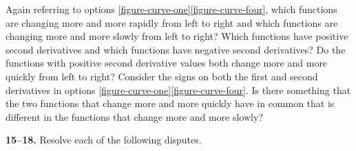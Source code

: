 \documentclass[10pt,oneside,]{book}
\theoremstyle{plain}
\theoremstyle{definition}
\numberwithin{equation}{section}
\newcounter{figstack}
\newcounter{figindex}
\newlength\fight
\newcommand\pushValignCaptionBottom[5][b]{%
\stepcounter{figstack}%
\expandafter\def\csname %
figalign\romannumeral\value{figstack}\endcsname{#1}%
\expandafter\def\csname %
figtype\romannumeral\value{figstack}\endcsname{#2}%
\expandafter\def\csname %
figwd\romannumeral\value{figstack}\endcsname{#3}%
\expandafter\def\csname %
figcontent\romannumeral\value{figstack}\endcsname{#4}%
\expandafter\def\csname %
figcap\romannumeral\value{figstack}\endcsname{#5}%
\setbox0=\hbox{%
\begin{#2}{#3}#4\end{#2}}%
\ifdim\dimexpr\ht0+\dp0\relax>\fight\global\setlength{\fight}{%
\dimexpr\ht0+\dp0\relax}\fi%
}
\newcommand\popValignCaptionBottom{%
\setcounter{figindex}{0}%
\hfill%
\whiledo{\value{figindex}<\value{figstack}}{%
\stepcounter{figindex}%
\def\tmp{\csname figwd\romannumeral\value{figindex}\endcsname}%
\begin{\csname figtype\romannumeral\value{figindex}\endcsname}[t]{\tmp}%
\centering%
\stackinset{c}{}%
{\csname figalign\romannumeral\value{figindex}\endcsname}{}%
{\csname figcontent\romannumeral\value{figindex}\endcsname}%
{\rule{0pt}{\fight}}\par%
\csname figcap\romannumeral\value{figindex}\endcsname%
\end{\csname figtype\romannumeral\value{figindex}\endcsname}%
\hfill%
}%
\setcounter{figstack}{0}%
\setlength{\fight}{0pt}%
\hfill%
}
\begin{document}
\begin{exercisegroup}
\exercise[13.]\hypertarget{exercise-290}{\null}Again referring to options \hyperref[figure-curve-one]{\ref{figure-curve-one}}\textendash{}\hyperref[figure-curve-four]{\ref{figure-curve-four}}, which functions are changing more and more rapidly from left to right and which functions are changing more and more slowly from left to right? Which functions have positive second derivatives and which functions have negative second derivatives?  Do the functions with positive second derivative values both change more and more quickly from left to right?%
\exercise[14.]\hypertarget{exercise-291}{\null}Consider the signs on both the first and second derivatives in options \hyperref[figure-curve-one]{\ref{figure-curve-one}}\textendash{}\hyperref[figure-curve-four]{\ref{figure-curve-four}}.  Is there something that the two functions that change more and more quickly have in common that is different in the functions that change more and more slowly?%
\end{exercisegroup}
\par\smallskip\noindent
\textbf{15--18. }\hypertarget{exercisegroup-61}{\null}Resolve each of the following disputes.%
\par
\end{document}
